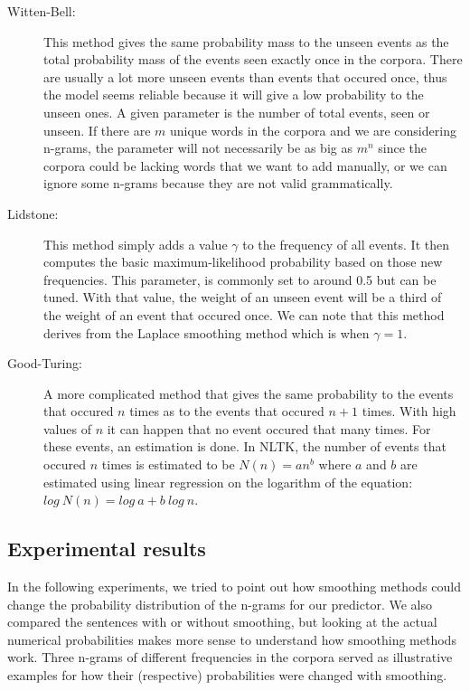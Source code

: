 \documentclass[a4paper,12pt]{article}
\begin{document}
	\begin{description}
		\item[Witten-Bell:] This method gives the same probability mass to the unseen events as the total probability mass of the events seen exactly once in the corpora. There are usually a lot more unseen events than events that occured once, thus the model seems reliable because it will give a low probability to the unseen ones. A given parameter is the number of total events, seen or unseen. If there are $m$ unique words in the corpora and we are considering n-grams, the parameter will not necessarily be as big as $m^n$ since the corpora could be lacking words that we want to add manually, or we can ignore some n-grams because they are not valid grammatically.
		\item[Lidstone:] This method simply adds a value $\gamma$ to the frequency of all events. It then computes the basic maximum-likelihood probability based on those new frequencies. This parameter, is commonly set to around 0.5 but can be tuned. With that value, the weight of an unseen event will be a third of the weight of an event that occured once. We can note that this method derives from the Laplace smoothing method which is when $\gamma = 1$.
		\item[Good-Turing:] A more complicated method that gives the same probability to the events that occured $n$ times as to the events that occured $n+1$ times. With high values of $n$ it can happen that no event occured that many times. For these events, an estimation is done. In NLTK, the number of events that occured $n$ times is estimated to be $N(n) = an^b$ where $a$ and $b$ are estimated using linear regression on the logarithm of the equation: $log\ N(n) = log\ a + b\ log\ n$.
	\end{description}
	
	\subsection{Experimental results}
	
	In the following experiments, we tried to point out how smoothing methods could change the probability distribution of the n-grams for our predictor. We also compared the sentences with or without smoothing, but looking at the actual numerical probabilities makes more sense to understand how smoothing methods work. Three n-grams of different frequencies in the corpora served as illustrative examples for how their (respective) probabilities were changed with smoothing.
	
\end{document}
